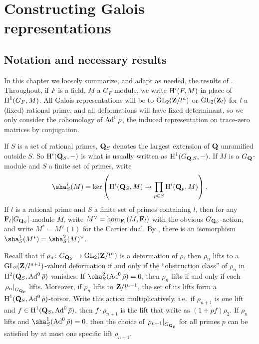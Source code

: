 
\chapter{Constructing Galois representations}





\section{Notation and necessary results}

In this chapter we loosely summarize, and adapt as needed, the results of 
\cite{khare-larsen-ramakrishna-2005,pande-2011}. Throughout, if $F$ is a field, 
$M$ a $G_F$-module, we write $\operatorname{H}^i(F,M)$ in place of $\operatorname{H}^1(G_F,M)$. All Galois 
representations will be to $\operatorname{GL}_2(\mathbf{Z}/l^n)$ or $\operatorname{GL}_2(\mathbf{Z}_l)$ for $l$ a (fixed) 
rational prime, and all deformations will have fixed determinant, so we only 
consider the cohomology of $\operatorname{Ad}^0\bar\rho$, the induced representation on 
trace-zero matrices by conjugation. 

If $S$ is a set of rational primes, $\mathbf{Q}_S$ denotes the largest extension of 
$\mathbf{Q}$ unramified outside $S$. So $\operatorname{H}^i(\mathbf{Q}_S,-)$ is what is usually written as 
$\operatorname{H}^1(G_{\mathbf{Q},S},-)$. If $M$ is a $G_{\mathbf{Q}}$-module and $S$ a finite set of primes, 
write 
\[
	\sha^i_S(M) = \ker\left( \h^i(\bQ_S,M) \to \prod_{p\in S} \h^i(\bQ_p,M)\right) .
\]
If $l$ is a rational prime and $S$ a finite set of primes containing $l$, then 
for any $\mathbf{F}_l[G_{\mathbf{Q}_S}]$-module $M$, write $M^\vee=\hom_{\mathbf{F}_l}(M,\mathbf{F}_l)$ 
with the obvious $G_{\mathbf{Q}_S}$-action, and write $M^\ast = M^\vee(1)$ for the 
Cartier dual. By \cite[Th.~8.6.7]{neukirch-schmidt-winberg-2008}, there is an 
isomorphism $\sha^1_S(M^\ast) = \sha_S^2(M)^\vee$. 

Recall that if $\rho_n\colon G_{\mathbf{Q}_S} \to \operatorname{GL}_2(\mathbf{Z}/l^n)$ is a deformation of 
$\bar\rho$, then $\rho_n$ lifts to a $\operatorname{GL}_2(\mathbf{Z}/l^{n+1})$-valued deformation if 
and only if the ``obstruction class'' of $\rho_n$ in 
$\operatorname{H}^2(\mathbf{Q}_S,\operatorname{Ad}^0\bar\rho)$ vanishes. If $\sha_S^2(\Ad^0\bar\rho) = 0$, then 
$\rho_n$ lifts if and only if each $\left.\rho_n\right|_{G_{\mathbf{Q}_p}}$ lifts. 
Moreover, if $\rho_n$ lifts to $\mathbf{Z}/l^{n+1}$, the set of its lifts form a 
$\operatorname{H}^1(\mathbf{Q}_S,\operatorname{Ad}^0\bar\rho)$-torsor. Write this action multiplicatively, i.e.~if 
$\rho_{n+1}$ is one lift and $f\in \operatorname{H}^1(\mathbf{Q}_S,\operatorname{Ad}^0\bar\rho)$, then 
$f\cdot \rho_{n+1}$ is the lift that \cite{khare-larsen-ramakrishna-2005} write 
as $(1+p f)\rho_2$. If $\rho_n$ lifts and $\sha_S^1(\Ad^0\bar\rho) = 0$, then 
the choice of $\left. \rho_{n+1}\right|_{G_{\mathbf{Q}_p}}$ for all primes $p$ can be 
satisfied by at most one specific lift $\rho_{n+1}$. 






